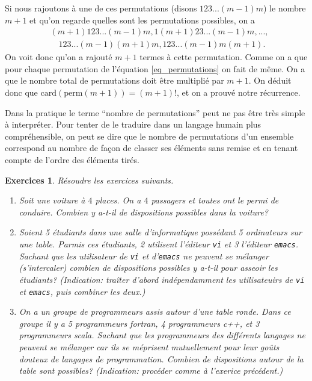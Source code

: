 \documentclass[a4paper,12pt]{book}
\newcommand{\perm}{\mathrm{perm}}
\newcommand{\card}{\mathrm{card}}
\newtheorem*{exercices}{Exercices}
\begin{document}
Si nous rajoutons à une de ces permutations (disons $123...(m-1)m$) le nombre $m+1$ et qu'on regarde quelles sont les permutations possibles, on a 
\begin{align}
 &(m+1)123...(m-1)m,1(m+1)23...(m-1)m,...,\nonumber\\
 &\quad 123...(m-1)(m+1)m,123...(m-1)m(m+1).
\end{align}
On voit donc qu'on a rajouté $m+1$ termes à cette permutation. Comme on a que pour chaque permutation de l'équation 
\eqref{eq_permutations} on fait de même. On a que le nombre total de permutations doit être multiplié par $m+1$.
On déduit donc que $\card(\perm(m+1))=(m+1)!$, et on a prouvé notre récurrence.

Dans la pratique le terme ``nombre de permutations'' peut ne pas être très simple à interpréter. Pour tenter de le traduire
dans un langage humain plus compréhensible, on peut se dire que le nombre de permutations d'un ensemble correspond au nombre de façon de classer 
ses éléments sans remise et en tenant compte de l'ordre des éléments tirés.
\begin{exercices}
 Résoudre les exercices suivants.
 \begin{enumerate}
  \item Soit une voiture à $4$ places. On a $4$ passagers et toutes ont le permi de conduire. Combien y a-t-il de dispositions possibles dans la voiture?
  \item Soient 5 étudiants dans une salle d'informatique possédant 5 ordinateurs
  sur une table. Parmis ces étudiants, 2 utilisent l'éditeur \texttt{vi} et 3 l'éditeur \texttt{emacs}. Sachant que les utilisateur de \texttt{vi} et d'\texttt{emacs} ne peuvent se mélanger (s'intercaler)
  combien de dispositions possibles y a-t-il pour asseoir les étudiants? (Indication: traîter d'abord indépendamment les utilisateuirs de \texttt{vi} et \texttt{emacs}, puis combiner les deux.)
  \item On a un groupe de programmeurs assis autour d'une table ronde. Dans ce groupe il y a 5 programmeurs fortran, 4 programmeurs c++, et 3 programmeurs scala. Sachant que les programmeurs des différents langages ne peuvent se mélanger car ils se méprisent mutuellement pour leur goûts douteux de langages de programmation. Combien de dispositions autour de la table sont possibles? (Indication: procéder comme à l'exerice précédent.)
 \end{enumerate}

\end{exercices}
\end{document}
